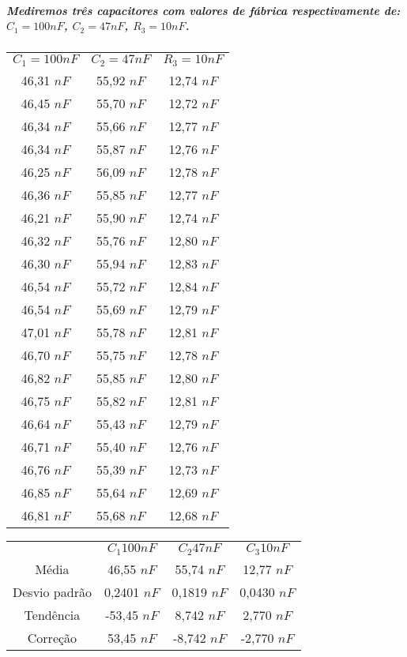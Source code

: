 \documentclass[12pt,twoside, a4paper, twocolumn]{article}
\begin{document}
\subparagraph*{Mediremos três capacitores com valores de fábrica respectivamente de: $C_1 = 100 nF$, $C_2 = 47 nF$, $R_3 = 10 nF$.}
\begin{center}
    \begin{tabular}{ |c|c|c| }
        \hline
        $C_1 = 100 nF$ & $C_2 = 47 nF$ & $R_3 = 10 nF$ \\
        46,31 $nF$     & 55,92 $nF$    & 12,74 $nF$    \\
        46,45 $nF$     & 55,70 $nF$    & 12,72 $nF$    \\
        46,34 $nF$     & 55,66 $nF$    & 12,77 $nF$    \\
        46,34 $nF$     & 55,87 $nF$    & 12,76 $nF$    \\
        46,25 $nF$     & 56,09 $nF$    & 12,78 $nF$    \\
        46,36 $nF$     & 55,85 $nF$    & 12,77 $nF$    \\
        46,21 $nF$     & 55,90 $nF$    & 12,74 $nF$    \\
        46,32 $nF$     & 55,76 $nF$    & 12,80 $nF$    \\
        46,30 $nF$     & 55,94 $nF$    & 12,83 $nF$    \\
        46,54 $nF$     & 55,72 $nF$    & 12,84 $nF$    \\
        46,54 $nF$     & 55,69 $nF$    & 12,79 $nF$    \\
        47,01 $nF$     & 55,78 $nF$    & 12,81 $nF$    \\
        46,70 $nF$     & 55,75 $nF$    & 12,78 $nF$    \\
        46,82 $nF$     & 55,85 $nF$    & 12,80 $nF$    \\
        46,75 $nF$     & 55,82 $nF$    & 12,81 $nF$    \\
        46,64 $nF$     & 55,43 $nF$    & 12,79 $nF$    \\
        46,71 $nF$     & 55,40 $nF$    & 12,76 $nF$    \\
        46,76 $nF$     & 55,39 $nF$    & 12,73 $nF$    \\
        46,85 $nF$     & 55,64 $nF$    & 12,69 $nF$    \\
        46,81 $nF$     & 55,68 $nF$    & 12,68 $nF$    \\

        \hline
    \end{tabular}
\end{center}

\begin{center}
    \begin{tabular}{ |c|c|c|c| }
        \hline
                      & $C_1 100 nF$ & $C_2 47 nF$ & $C_3 10 nF$ \\
        Média         & 46,55 $nF$   & 55,74 $nF$  & 12,77 $nF$  \\
        Desvio padrão & 0,2401 $nF$  & 0,1819 $nF$ & 0,0430 $nF$ \\
        Tendência     & -53,45 $nF$  & 8,742 $nF$  & 2,770 $nF$  \\
        Correção      & 53,45 $nF$   & -8,742 $nF$ & -2,770 $nF$ \\
        \hline
    \end{tabular}
\end{center}
\end{document}
